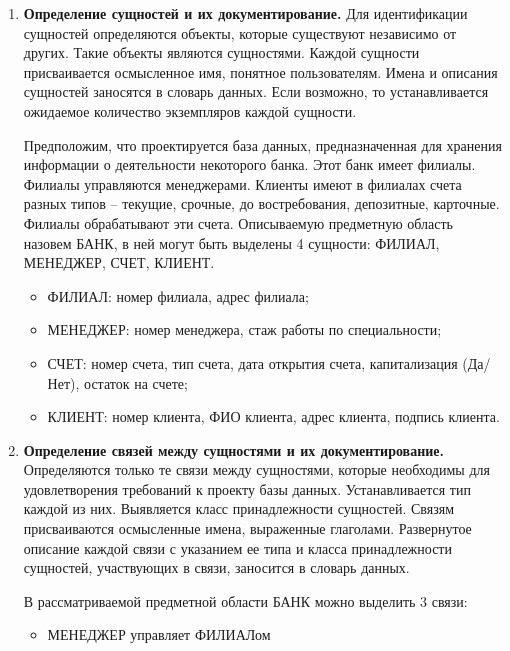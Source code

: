 \begin{enumerate}
	\item \textbf{Определение сущностей и их документирование.}
	Для идентификации сущностей определяются объекты, которые существуют независимо от других. Такие объекты
	являются сущностями. Каждой сущности присваивается осмысленное имя, понятное пользователям. Имена и
	описания сущностей заносятся в словарь данных. Если возможно, то устанавливается ожидаемое количество
	экземпляров каждой сущности.
	
	Предположим, что проектируется база данных, предназначенная для хранения информации о деятельности некоторого банка. Этот банк
	имеет филиалы. Филиалы управляются менеджерами. Клиенты имеют в филиалах счета разных типов – текущие, срочные, до востребования, депозитные, карточные.
	Филиалы обрабатывают эти счета. Описываемую предметную область назовем БАНК, в ней могут быть выделены 4 сущности: ФИЛИАЛ, МЕНЕДЖЕР, СЧЕТ, КЛИЕНТ.
	\begin{itemize}
		
		\item ФИЛИАЛ: номер филиала, адрес филиала;
		
		\item МЕНЕДЖЕР: номер менеджера, стаж работы по специальности;
		
		\item СЧЕТ: номер счета, тип счета, дата открытия счета, капитализация (Да/Нет), остаток на счете;
		
		\item КЛИЕНТ: номер клиента, ФИО клиента, адрес клиента, подпись клиента.
		
	\end{itemize}
	
	\item \textbf{Определение связей между сущностями и их документирование.}
	Определяются только те связи между сущностями, которые необходимы для удовлетворения требований к проекту
	базы данных. Устанавливается тип каждой из них. Выявляется класс принадлежности сущностей. Связям
	присваиваются осмысленные имена, выраженные глаголами. Развернутое описание каждой связи с указанием ее
	типа и класса принадлежности сущностей, участвующих в связи, заносится в словарь данных.
	
	В рассматриваемой предметной области БАНК можно выделить 3 связи:
	\begin{itemize}
		
		\item МЕНЕДЖЕР управляет ФИЛИАЛом
		

\end{itemize}
\end{enumerate}
